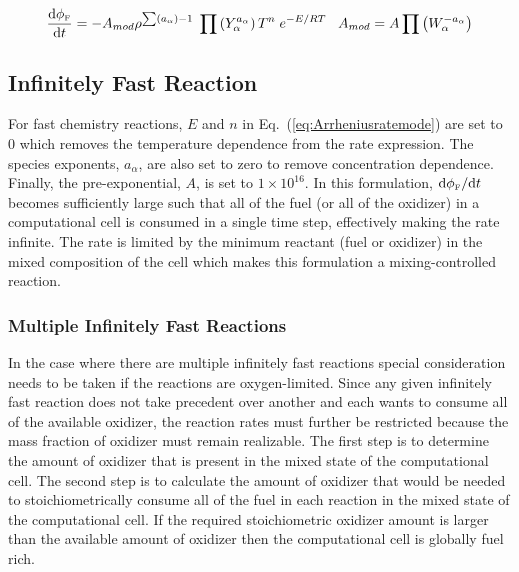 \begin{equation}\label{eq:Arrheniusratemode}
\frac{\mbox{d}\phi_{\tiny \hbox{F}}}{\mbox{d}t} = -A_{mod} \rho^{\sum (a_{\alpha}) -1} \; \prod \left(Y_{\alpha}^{a_{\alpha}} \right) T^n \; e^{-E/RT} \;\;\; A_{mod} = A \prod \left(W_{\alpha}^{-a_{\alpha}} \right)  
\end{equation}

\subsection{Infinitely Fast Reaction}
For fast chemistry reactions, $E$ and $n$ in Eq.~(\ref{eq:Arrheniusratemode}) are set to $0$ which removes the temperature dependence from the rate expression. The species exponents, $a_{\alpha}$, are also set to zero to remove concentration dependence. Finally, the pre-exponential, $A$, is set to $1 \times 10^{16}$. In this formulation, $\mbox{d}\phi_{\tiny \hbox{F}}/\mbox{d}t$ becomes sufficiently large such that all of the fuel (or all of the oxidizer) in a computational cell is consumed in a single time step, effectively making the rate infinite. The rate is limited by the minimum reactant (fuel or oxidizer) in the mixed composition of the cell which makes this formulation a mixing-controlled reaction.

\subsubsection{Multiple Infinitely Fast Reactions}   
In the case where there are multiple infinitely fast reactions special consideration needs to be taken if the reactions are oxygen-limited. Since any given infinitely fast reaction does not take precedent over another and each wants to consume all of the available oxidizer, the reaction rates must further be restricted because the mass fraction of oxidizer must remain realizable. The first step is to determine the amount of oxidizer that is present in the mixed state of the computational cell. The second step is to calculate the amount of oxidizer that would be needed to stoichiometrically consume all of the fuel in each reaction in the mixed state of the computational cell. If the required stoichiometric oxidizer amount is larger than the available amount of oxidizer then the computational cell is globally fuel rich.

